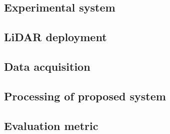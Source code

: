 \subsection{Experimental system}


\subsection{LiDAR deployment}


\subsection{Data acquisition}


\subsection{Processing of proposed system}


\subsection{Evaluation metric}
